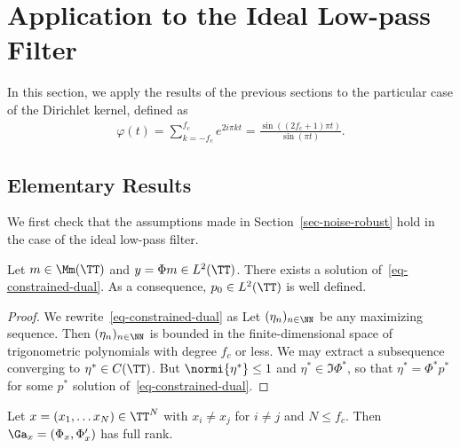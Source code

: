 
\section{Application to the Ideal Low-pass Filter}
\label{sec-idealLP}

In this section, we apply the results of the previous sections to the particular case of the Dirichlet kernel, defined as
\begin{align}
	\varphi(t) = \sum_{k=-f_c}^{f_c} e^{2i\pi kt} = \frac{\sin \left((2f_c+1)\pi t\right)}{\sin (\pi t)}.
\end{align}


\subsection{Elementary Results}

We first check that the assumptions made in Section~\ref{sec-noise-robust} hold in the case of the ideal low-pass filter.


\begin{prop}[Existence of $p_0$]
Let $m\in \Mm(\TT)$ and $y=\Phi m\in L^2(\TT)$. There exists a solution of~\eqref{eq-constrained-dual}.
As a consequence, $p_0\in L^2(\TT)$ is well defined.
\end{prop}

\begin{proof}
We rewrite~\eqref{eq-constrained-dual} as 
Let $(\eta_n)_{n\in \NN}$ be any maximizing sequence. Then $(\eta_n)_{n\in \NN}$ is bounded in the finite-dimensional space of trigonometric polynomials with degree $f_c$ or less. We may extract a subsequence converging to $\eta^*\in C(\TT)$. But $\normi{\eta^*} \leq 1$ and $\eta^*\in \Im \Phi^*$,
so that $\eta^*=\Phi^*p^*$ for some $p^*$ solution of~\eqref{eq-constrained-dual}.
\end{proof}

\begin{prop}[Injectivity of $\Ga_{x}$]
Let $x=(x_1,\ldots x_N)\in \TT^N$ with $x_i\neq x_j$ for $i\neq j$ and $N\leq f_c$.
Then $\Ga_x=(\Phi_x, \Phi_x')$ has full rank.
\end{prop}

